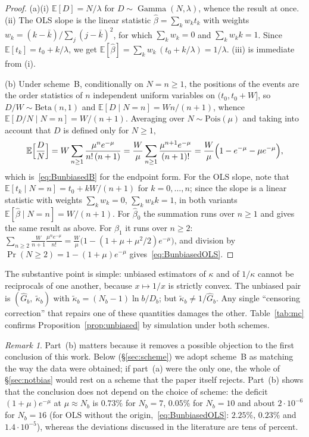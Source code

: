 \documentclass[11pt,a4paper]{article}
\theoremstyle{plain}
\theoremstyle{remark}
\newtheorem{remark}{Remark}
\DeclareMathOperator{\Gam}{Gamma}
\begin{document}
\begin{proof}
(a)(i) $\mathbb E[D]=N/\lambda$ for $D\sim\Gam(N,\lambda)$, whence the result at
once. (ii) The OLS slope is the linear statistic $\hat\beta=\sum_k w_k t_k$ with
weights $w_k=(k-\bar k)/\sum_j(j-\bar k)^2$, for which $\sum_k w_k=0$ and
$\sum_k w_k k=1$. Since $\mathbb E[t_k]=t_0+k/\lambda$, we get
$\mathbb E[\hat\beta]=\sum_k w_k\,(t_0+k/\lambda)=1/\lambda$.
(iii) is immediate from (i).

(b) Under scheme~B, conditionally on $N=n\ge1$, the positions of the events are
the order statistics of $n$ independent uniform variables on $(t_0,t_0+W]$, so
$D/W\sim\mathrm{Beta}(n,1)$ and $\mathbb E[D\mid N=n]=Wn/(n+1)$, whence
$\mathbb E[D/N\mid N=n]=W/(n+1)$. Averaging over $N\sim\mathrm{Pois}(\mu)$ and
taking into account that $D$ is defined only for $N\ge1$,
\[
\mathbb E\Bigl[\frac{D}{N}\Bigr]
=W\sum_{n\ge1}\frac{\mu^{n}e^{-\mu}}{n!\,(n+1)}
=\frac{W}{\mu}\sum_{n\ge1}\frac{\mu^{n+1}e^{-\mu}}{(n+1)!}
=\frac{W}{\mu}\Bigl(1-e^{-\mu}-\mu e^{-\mu}\Bigr),
\]
which is~\eqref{eq:BunbiasedB} for the endpoint form. For the OLS slope, note
that $\mathbb E[t_k\mid N=n]=t_0+kW/(n+1)$ for $k=0,\dots,n$; since the slope is
a linear statistic with weights $\sum_kw_k=0$, $\sum_kw_kk=1$, in both variants
$\mathbb E[\hat\beta\mid N=n]=W/(n+1)$. For $\hat\beta_0$ the summation runs over
$n\ge1$ and gives the same result as above. For $\hat\beta_1$ it runs over
$n\ge2$: $\sum_{n\ge2}\frac{W}{n+1}\frac{\mu^ne^{-\mu}}{n!}
=\frac{W}{\mu}\bigl(1-(1+\mu+\mu^2/2)e^{-\mu}\bigr)$, and division by
$\Pr(N\ge2)=1-(1+\mu)e^{-\mu}$ gives~\eqref{eq:BunbiasedOLS}.
\end{proof}

The substantive point is simple: unbiased estimators of $\kappa$ and of
$1/\kappa$ cannot be reciprocals of one another, because $x\mapsto1/x$ is
strictly convex. The unbiased pair is $(\hat G_b,\ \tilde\kappa_b)$ with
$\tilde\kappa_b=(N_b-1)\ln b/D_b$; but $\tilde\kappa_b\ne1/\hat G_b$. Any single
``censoring correction'' that repairs one of these quantities damages the other.
Table~\ref{tab:mc} confirms Proposition~\ref{prop:unbiased} by simulation under
both schemes.

\begin{remark}\label{rem:schemeindep}
Part~(b) matters because it removes a possible objection to the first
conclusion of this work. Below (\S\ref{sec:scheme}) we adopt scheme~B as
matching the way the data were obtained; if part~(a) were the only one, the
whole of \S\ref{sec:notbias} would rest on a scheme that the paper itself
rejects. Part~(b) shows that the conclusion does not depend on the choice of
scheme: the deficit $(1+\mu)e^{-\mu}$ at $\mu\approx N_b$ is $0.73\%$ for
$N_b=7$, $0.05\%$ for $N_b=10$ and about $2\cdot10^{-6}$ for $N_b=16$ (for OLS
without the origin,~\eqref{eq:BunbiasedOLS}: $2.25\%$, $0.23\%$ and
$1.4\cdot10^{-5}$), whereas the deviations discussed in the literature are tens
of percent.
\end{remark}
\end{document}
